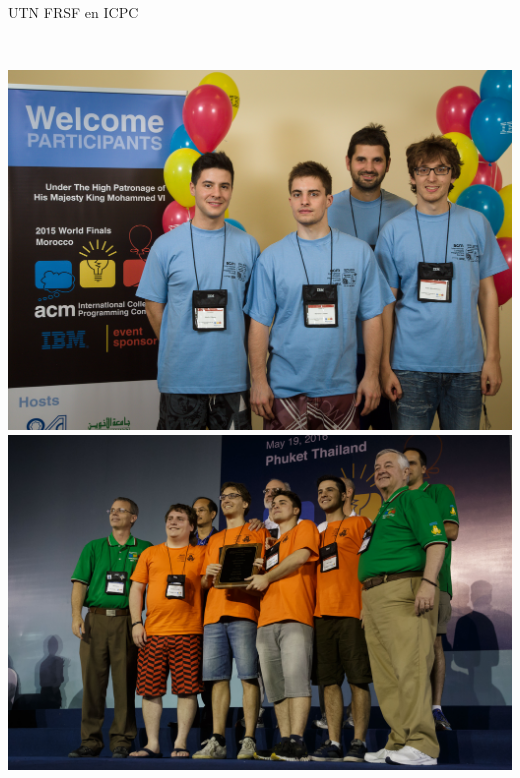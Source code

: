 \documentclass{beamer}
\begin{document}
\begin{frame}{UTN FRSF en ICPC}
    \begin{columns}[t]
        \\
        \includegraphics[width=1\textwidth]{img/2015_marruecos.jpg}
        \\
        \includegraphics[width=1\textwidth]{img/2016_thailand.jpg}
    \end{columns}
\end{frame}
\end{document}
